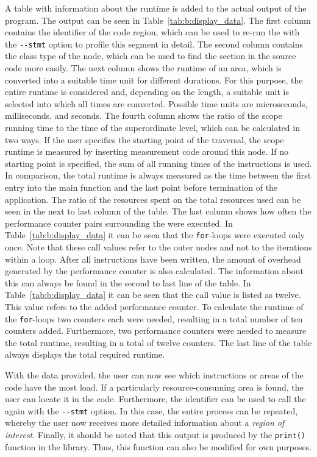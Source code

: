 A table with information about the runtime is added to the actual output of the program. The output can be seen in Table~\ref{tab:b:display_data}. The first column contains the identifier of the code region, which can be used to re-run the \TOOL with the \lstinline{--stmt} option to profile this segment in detail. The second column contains the class type of the node, which can be used to find the section in the source code more easily. The next column shows the runtime of an area, which is converted into a suitable time unit for different durations. For this purpose, the entire runtime is considered and, depending on the length, a suitable unit is selected into which all times are converted. Possible time units are microseconds, milliseconds, and seconds. The fourth column shows the ratio of the scope running time to the time of the superordinate level, which can be calculated in two ways. If the user specifies the starting point of the traversal, the scope runtime is measured by inserting measurement code around this node. If no starting point is specified, the sum of all running times of the instructions is used. In comparison, the total runtime is always measured as the time between the first entry into the main function and the last point before termination of the application. The ratio of the resources spent on the total resources used can be seen in the next to last column of the table. The last column shows how often the performance counter pairs surrounding the \STAT were executed. In Table~\ref{tab:b:display_data} it can be seen that the \lstinline{for}-loops were executed only once. Note that these call values refer to the outer nodes and not to the iterations within a loop. After all instructions have been written, the amount of overhead generated by the performance counter is also calculated. The information about this can always be found in the second to last line of the table. In Table~\ref{tab:b:display_data} it can be seen that the call value is listed as twelve. This value refers to the added performance counter. To calculate the runtime of the \lstinline{for}-loops two counters each were needed, resulting in a total number of ten counters added. Furthermore, two performance counters were needed to measure the total runtime, resulting in a total of twelve counters. The last line of the table always displays the total required runtime. 

With the data provided, the user can now see which instructions or areas of the code have the most load. If a particularly resource-consuming area is found, the user can locate it in the code. Furthermore, the identifier can be used to call the \TOOL again with the \lstinline{--stmt} option. In this case, the entire process can be repeated, whereby the user now receives more detailed information about a \emph{region of interest}. Finally, it should be noted that this output is produced by the \lstinline{print()} function in the \DATA library. Thus, this function can also be modified for own purposes. 